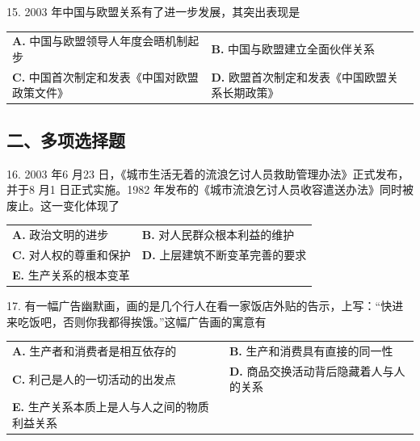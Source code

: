 \documentclass[UTF8,11pt]{ctexart}
\begin{document}
15. 2003 年中国与欧盟关系有了进一步发展，其突出表现是


\begin{center}\begin{tabular}{>{\raggedright\arraybackslash}p{\dimexpr(\linewidth-4\tabcolsep)/2\relax}>{\raggedright\arraybackslash}p{\dimexpr(\linewidth-4\tabcolsep)/2\relax}}
\textbf{A.} 中国与欧盟领导人年度会晤机制起步 & \textbf{B.} 中国与欧盟建立全面伙伴关系\\[.35em]
\textbf{C.} 中国首次制定和发表《中国对欧盟政策文件》 & \textbf{D.} 欧盟首次制定和发表《中国欧盟关系长期政策》\\[.35em]\end{tabular}\end{center}

\subsection*{二、多项选择题}

16. 2003 年6 月23 日，《城市生活无着的流浪乞讨人员救助管理办法》正式发布，并于8 月1 日正式实施。1982 年发布的《城市流浪乞讨人员收容遣送办法》同时被废止。这一变化体现了


\begin{center}\begin{tabular}{>{\raggedright\arraybackslash}p{\dimexpr(\linewidth-4\tabcolsep)/2\relax}>{\raggedright\arraybackslash}p{\dimexpr(\linewidth-4\tabcolsep)/2\relax}}
\textbf{A.} 政治文明的进步 & \textbf{B.} 对人民群众根本利益的维护\\[.35em]
\textbf{C.} 对人权的尊重和保护 & \textbf{D.} 上层建筑不断变革完善的要求\\[.35em]
\textbf{E.} 生产关系的根本变革 & \\[.35em]\end{tabular}\end{center}

17. 有一幅广告幽默画，画的是几个行人在看一家饭店外贴的告示，上写：“快进来吃饭吧，否则你我都得挨饿。”这幅广告画的寓意有


\begin{center}\begin{tabular}{>{\raggedright\arraybackslash}p{\dimexpr(\linewidth-4\tabcolsep)/2\relax}>{\raggedright\arraybackslash}p{\dimexpr(\linewidth-4\tabcolsep)/2\relax}}
\textbf{A.} 生产者和消费者是相互依存的 & \textbf{B.} 生产和消费具有直接的同一性\\[.35em]
\textbf{C.} 利己是人的一切活动的出发点 & \textbf{D.} 商品交换活动背后隐藏着人与人的关系\\[.35em]
\textbf{E.} 生产关系本质上是人与人之间的物质利益关系 & \\[.35em]\end{tabular}\end{center}
\end{document}
